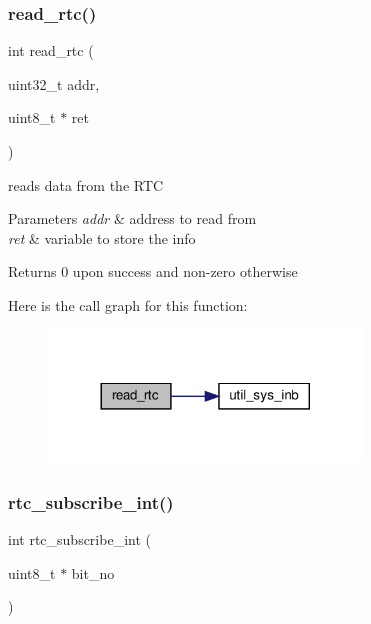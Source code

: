 \subsubsection{\texorpdfstring{read\+\_\+rtc()}{read\_rtc()}}
{\footnotesize\ttfamily int read\+\_\+rtc (\begin{DoxyParamCaption}\item[{uint32\+\_\+t}]{addr,  }\item[{uint8\+\_\+t $\ast$}]{ret }\end{DoxyParamCaption})}



reads data from the R\+TC 


\begin{DoxyParams}{Parameters}
{\em addr} & address to read from \\
\hline
{\em ret} & variable to store the info \\
\hline
\end{DoxyParams}
\begin{DoxyReturn}{Returns}
0 upon success and non-\/zero otherwise 
\end{DoxyReturn}
Here is the call graph for this function\+:\nopagebreak
\begin{figure}[H]
\begin{center}
\leavevmode
\includegraphics[width=236pt]{group__RealTimeClock_gae37f65cb1eda30db92728dc94bb52b76_cgraph}
\end{center}
\end{figure}
\mbox{\label{group__RealTimeClock_ga5171a9c0f54940fe60f7500896afcc86}} 
\subsubsection{\texorpdfstring{rtc\+\_\+subscribe\+\_\+int()}{rtc\_subscribe\_int()}}
{\footnotesize\ttfamily int rtc\+\_\+subscribe\+\_\+int (\begin{DoxyParamCaption}\item[{uint8\+\_\+t $\ast$}]{bit\+\_\+no }\end{DoxyParamCaption})}



